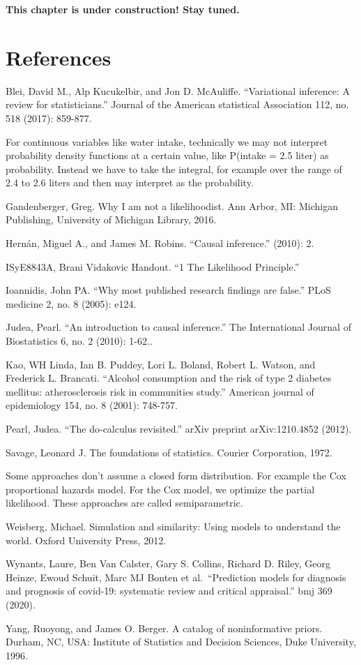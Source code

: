 \documentclass[
  10pt,
]{scrbook}
\begin{document}
\textbf{This chapter is under construction! Stay tuned.}

\hypertarget{references}{%
\chapter*{References}\label{references}}


Blei, David M., Alp Kucukelbir, and Jon D. McAuliffe. ``Variational inference: A review for statisticians.'' Journal of the American statistical Association 112, no. 518 (2017): 859-877.

For continuous variables like water intake, technically we may not interpret probability density functions at a certain value, like P(intake = 2.5 liter) as probability. Instead we have to take the integral, for example over the range of 2.4 to 2.6 liters and then may interpret as the probability.

Gandenberger, Greg. Why I am not a likelihoodist. Ann Arbor, MI: Michigan Publishing, University of Michigan Library, 2016.

Hernán, Miguel A., and James M. Robins. ``Causal inference.'' (2010): 2.

ISyE8843A, Brani Vidakovic Handout. ``1 The Likelihood Principle.''

Ioannidis, John PA. ``Why most published research findings are false.'' PLoS medicine 2, no. 8 (2005): e124.

Judea, Pearl. ``An introduction to causal inference.'' The International Journal of Biostatistics 6, no. 2 (2010): 1-62..

Kao, WH Linda, Ian B. Puddey, Lori L. Boland, Robert L. Watson, and Frederick L. Brancati. ``Alcohol consumption and the risk of type 2 diabetes mellitus: atherosclerosis risk in communities study.'' American journal of epidemiology 154, no. 8 (2001): 748-757.

Pearl, Judea. ``The do-calculus revisited.'' arXiv preprint arXiv:1210.4852 (2012).

Savage, Leonard J. The foundations of statistics. Courier Corporation, 1972.

Some approaches don't assume a closed form distribution. For example the Cox proportional hazards model. For the Cox model, we optimize the partial likelihood. These approaches are called semiparametric.

Weisberg, Michael. Simulation and similarity: Using models to understand the world. Oxford University Press, 2012.

Wynants, Laure, Ben Van Calster, Gary S. Collins, Richard D. Riley, Georg Heinze, Ewoud Schuit, Marc MJ Bonten et al.~``Prediction models for diagnosis and prognosis of covid-19: systematic review and critical appraisal.'' bmj 369 (2020).

Yang, Ruoyong, and James O. Berger. A catalog of noninformative priors. Durham, NC, USA: Institute of Statistics and Decision Sciences, Duke University, 1996.

\printindex
\thispagestyle{empty}
\end{document}
